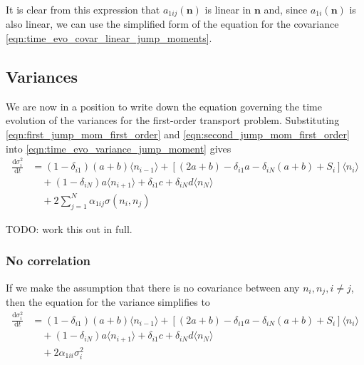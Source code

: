 \documentclass[a4paper,11pt]{article}
\numberwithin{equation}{section}
\newcommand{\diff}[2]{\frac{\mathrm{d} #1}{\mathrm{d} #2}}
\newcommand{\V}[1]{\mathbf{#1}}
\newcommand{\E}[1]{\langle #1 \rangle}
\begin{document}
It is clear from this expression that \(a_{1ij}(\V{n})\) is linear in \(\V{n}\)
and, since \(a_{1i}(\V{n})\) is also linear, we can use the simplified form of
the equation for the covariance \eqref{eqn:time_evo_covar_linear_jump_moments}.

\subsection{Variances}
We are now in a position to write down the equation governing the time
evolution of the variances for the first-order transport problem. Substituting
\eqref{eqn:first_jump_mom_first_order} and
\eqref{eqn:second_jump_mom_first_order} into
\eqref{eqn:time_evo_variance_jump_moment} gives
\begin{equation}
    \begin{aligned}
        \diff{\sigma_i^2}{t} &= (1-\delta_{i1})(a+b)\E{n_{i-1}} +
        \left[(2a+b) - \delta_{i1}a - \delta_{iN}(a+b) + S_i\right]\E{n_i}\\
        &\quad+ (1-\delta_{iN})a\E{n_{i+1}} + \delta_{i1}c + \delta_{iN}d \E{n_N}\\
        &\quad+ 2 \sum_{j=1}^N \alpha_{1ij} \sigma(n_i,n_j)
    \end{aligned}
    \label{eqn:time_evo_variance_first_order}
\end{equation}

TODO: work this out in full.

\subsubsection{No correlation}
If we make the assumption that there is no covariance between any \(n_i, n_j,
i\neq j\), then the equation for the variance simplifies to
\begin{equation}
    \begin{aligned}
        \diff{\sigma_i^2}{t} &= (1-\delta_{i1})(a+b)\E{n_{i-1}} +
        \left[(2a+b) - \delta_{i1}a - \delta_{iN}(a+b) + S_i\right]\E{n_i}\\
        &\quad+ (1-\delta_{iN})a\E{n_{i+1}} + \delta_{i1}c + \delta_{iN}d \E{n_N}\\
        &\quad+ 2 \alpha_{1ii} \sigma_i^2
    \end{aligned}
    \label{eqn:time_evo_variance_first_order_no_corr}
\end{equation}
\end{document}
